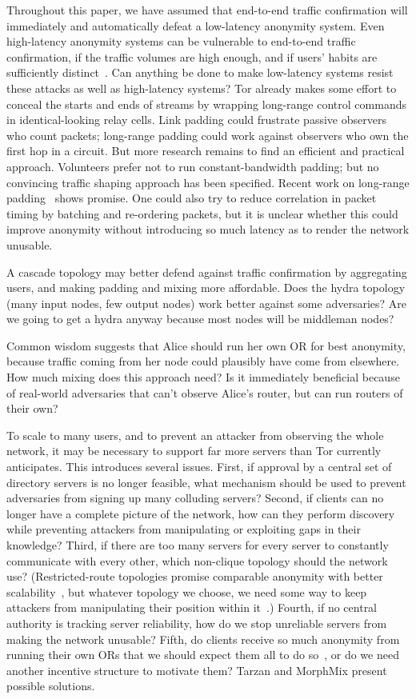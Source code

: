 \documentclass[times,10pt,twocolumn]{article}
\begin{document}
Throughout this paper, we have assumed that end-to-end traffic
confirmation will immediately and automatically defeat a low-latency
anonymity system. Even high-latency anonymity systems can be
vulnerable to end-to-end traffic confirmation, if the traffic volumes
are high enough, and if users' habits are sufficiently
distinct~\cite{statistical-disclosure,limits-open}. Can anything be
done to
make low-latency systems resist these attacks as well as high-latency
systems? Tor already makes some effort to conceal the starts and ends of
streams by wrapping long-range control commands in identical-looking
relay cells. Link padding could frustrate passive observers who count
packets; long-range padding could work against observers who own the
first hop in a circuit. But more research remains to find an efficient
and practical approach. Volunteers prefer not to run constant-bandwidth
padding; but no convincing traffic shaping approach has been
specified. Recent work on long-range padding~\cite{defensive-dropping}
shows promise. One could also try to reduce correlation in packet timing
by batching and re-ordering packets, but it is unclear whether this could
improve anonymity without introducing so much latency as to render the
network unusable.

A cascade topology may better defend against traffic confirmation by
aggregating users, and making padding and
mixing more affordable.  Does the hydra topology (many input nodes,
few output nodes) work better against some adversaries? Are we going
to get a hydra anyway because most nodes will be middleman nodes?

Common wisdom suggests that Alice should run her own OR for best
anonymity, because traffic coming from her node could plausibly have
come from elsewhere. How much mixing does this approach need?  Is it
immediately beneficial because of real-world adversaries that can't
observe Alice's router, but can run routers of their own?

To scale to many users, and to prevent an attacker from observing the
whole network, it may be necessary
to support far more servers than Tor currently anticipates.
This introduces several issues.  First, if approval by a central set
of directory servers is no longer feasible, what mechanism should be used
to prevent adversaries from signing up many colluding servers? Second,
if clients can no longer have a complete picture of the network,
how can they perform discovery while preventing attackers from
manipulating or exploiting gaps in their knowledge?  Third, if there
are too many servers for every server to constantly communicate with
every other, which non-clique topology should the network use?
(Restricted-route topologies promise comparable anonymity with better
scalability~\cite{danezis-pets03}, but whatever topology we choose, we
need some way to keep attackers from manipulating their position within
it~\cite{casc-rep}.) Fourth, if no central authority is tracking
server reliability, how do we stop unreliable servers from making
the network unusable?  Fifth, do clients receive so much anonymity
from running their own ORs that we should expect them all to do
so~\cite{econymics}, or do we need another incentive structure to
motivate them?  Tarzan and MorphMix present possible solutions.
\end{document}
